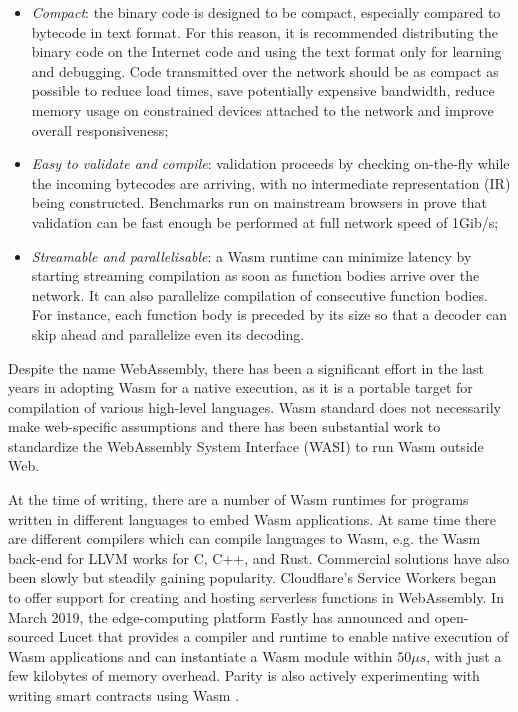 \documentclass{ieeeaccess}
\begin{document}
\begin{itemize}
    \item \emph{Compact}: the binary code is designed to be compact, especially compared to bytecode in text format. For this reason, it is recommended distributing the binary code on the Internet code and using the text format only for learning and debugging. Code transmitted over the network should be as compact as possible to reduce load times, save potentially expensive bandwidth, reduce memory usage on constrained devices attached to the network and improve overall responsiveness;
    \item \emph{Easy to validate and compile}: validation proceeds by checking on-the-fly while the incoming bytecodes are arriving, with no intermediate representation (IR) being constructed. Benchmarks run on mainstream browsers in \cite{wasm} prove that validation can be fast enough be performed at full network speed of 1Gib/s;
    \item \emph{Streamable and parallelisable}: a Wasm runtime can minimize latency by starting streaming compilation as soon as function bodies arrive over the network. It can also parallelize compilation of consecutive function bodies. For instance, each function body is preceded by its size so that a decoder can skip ahead and parallelize even its decoding.
\end{itemize}

Despite the name WebAssembly, there has been a significant effort in the last years in adopting Wasm for a native execution, as it is a portable target for compilation of various high-level languages. Wasm standard does not necessarily make web-specific assumptions and there has been substantial work to standardize the WebAssembly System Interface (WASI) to run Wasm outside Web.

At the time of writing, there are a number of Wasm runtimes for programs written in different languages to embed Wasm applications. At same time there are different compilers which can compile languages to Wasm, e.g. the Wasm back-end for LLVM \cite{llvm} works for C, C++, and Rust. Commercial solutions have also been slowly but steadily gaining popularity. Cloudflare's Service Workers \cite{cloudflare-workers} began to offer support for creating and hosting serverless functions in WebAssembly. In March 2019, the edge-computing platform Fastly has announced and open-sourced Lucet \cite{fastly-lucet} that provides a compiler and runtime to enable native execution of Wasm applications and can instantiate a Wasm module within $50\mu s$, with just a few kilobytes of memory overhead. Parity is also actively experimenting with writing smart contracts using Wasm \cite{parity-wasm}.
\end{document}
